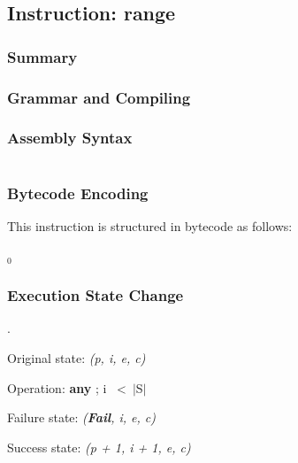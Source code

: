 \subsection{Instruction: range}

\subsubsection{Summary}

\subsubsection{Grammar and Compiling}

\subsubsection{Assembly Syntax}

\begin{myquote}
\begin{verbatim}

\end{verbatim}
\end{myquote}
\subsubsection{Bytecode Encoding}

This instruction is structured in bytecode as follows:

$_0$\ 

\subsubsection{Execution State Change}

.

Original state: \textit{(p, i, e, c)}

Operation: \textbf{any} ; i \ \textless \ $\vert$S$\vert$

Failure state: \textit{(\textbf{Fail}, i, e, c)}

Success state: \textit{(p + 1, i + 1, e, c)}

